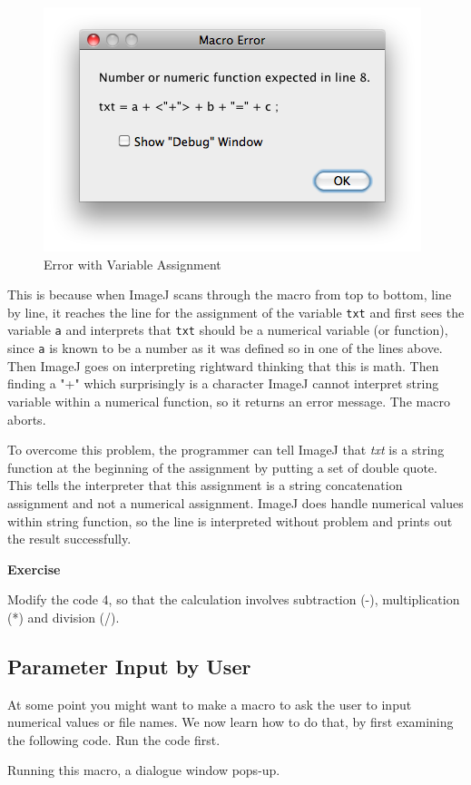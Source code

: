 \documentclass[11pt,a4paper,oneside]{report}
\newenvironment{indentexercise}[1]%
{{\setlength{\leftmargin}{2em}}%
\textbf{Exercise \thesubsection-#1}%
\begin{list}{}%
	\item%
}
{\end{list}}
\newcommand{\ilcom}[1]{\texttt{\small#1}}
\begin{document}
\begin{figure}[htbp]
\begin{center}
\includegraphics[scale=0.6]{fig/ErrorStringNumericFunction.png}
\caption{Error with Variable Assignment} \label{fig_ErrorVariable}
\end{center}
\end{figure}

This is because when ImageJ scans through the macro from top to bottom, line by line, 
it reaches the line for the assignment of the variable \ilcom{txt} and first sees the variable \ilcom{a} and interprets that \ilcom{txt} should be a numerical variable 
(or function), since \ilcom{a} is known to be a number as it was defined so in one of the lines above. Then ImageJ goes on interpreting rightward thinking that this is math. Then finding a "+" which surprisingly is a character
ImageJ cannot interpret string variable within a numerical function, so it returns an error message. The macro aborts.  

To overcome this problem, the programmer can tell ImageJ that 
\textit{txt} is a string function at the beginning of the assignment 
by putting a set of double quote. This tells the interpreter that this assignment is a string concatenation assignment and not a numerical assignment. 
ImageJ does handle numerical values within string function, 
so the line is interpreted without problem and prints out the result successfully.  

\begin{indentexercise}{2}
Modify the code 4, so that the calculation involves subtraction (-), multiplication (*) and division (/). 
\end{indentexercise}

\subsection{Parameter Input by User}
At some point you might want to make a macro to ask the user to input numerical
values or file names. We now learn how to do that, by first examining the
following code. Run the code first.

Running this macro,  a dialogue window pops-up.
\end{document}
